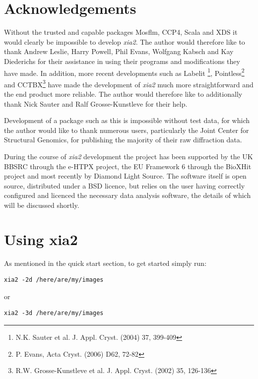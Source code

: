 \documentclass[a4paper, 11pt]{article}
\begin{document}
\section{Acknowledgements}

Without the trusted and capable packages Mosflm, CCP4, Scala and XDS it would 
clearly be impossible to develop \emph{xia2}. The author would therefore
like to thank Andrew Leslie, Harry Powell, Phil Evans, Wolfgang Kabsch 
and Kay Diederichs for their assistance in using their programs and 
modifications they have made. In addition, more recent developments
such as Labelit \footnote{N.K. Sauter et al. J. Appl. Cryst. (2004) 37, 
399-409}, Pointless\footnote{P. Evans, Acta Cryst. (2006) D62, 72-82}
and CCTBX\footnote{R.W. Grosse-Kunstleve et al. J. Appl. Cryst. (2002) 35, 
126-136} have made the development of \emph{xia2} much more straightforward
and the end product more reliable. The author would therefore like to
additionally thank Nick Sauter and Ralf Grosse-Kunstleve for their help.

Development of a package such as this is impossible without test data, for
which the author would like to thank numerous users, particularly the 
Joint Center for Structural Genomics, for publishing the majority of their
raw diffraction data. 

During the course of \emph{xia2} development the project has been 
supported by the UK BBSRC through the e-HTPX project, the EU Framework 6
through the BioXHit project and most recently by Diamond Light Source.
The software itself is open source, distributed under a BSD licence, but 
relies on the user having correctly configured and licenced the necessary
data analysis software, the details of which will be discussed shortly.

\clearpage

\section{Using xia2}

As mentioned in the quick start section, to get started simply run:

\begin{verbatim}
xia2 -2d /here/are/my/images
\end{verbatim}

\noindent
or

\begin{verbatim}
xia2 -3d /here/are/my/images
\end{verbatim}
\end{document}
